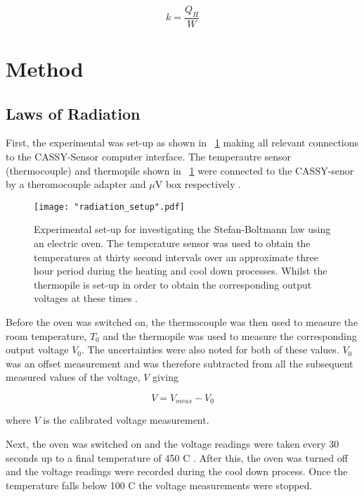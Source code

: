 \documentclass{article}
\newcommand{\figref}[2][\figurename~]{#1\ref{#2}}
\begin{document}
\begin{equation}
\label{eq:Heating}
k = \frac{Q_H}{W}
\end{equation}

 
\section{Method}
\label{sec:method}

\subsection{Laws of Radiation}
\label{ssec:radiaton-method}

First, the experimental was set-up as shown in \figref{fig:radiation} \cite{Paper01} making all relevant connections to the CASSY-Sensor computer interface. The temperautre sensor (thermocouple) and thermopile shown in \figref{fig:radiation} were connected to the CASSY-senor by a theromocouple adapter and $\mu$V box respectively \cite{Paper01}.

\begin{figure}[h]
\centering
\texttt{[image: "radiation\_setup".pdf]}
\caption{Experimental set-up for investigating the Stefan-Boltmann law using an electric oven. The temperature sensor was used to obtain the temperatures at thirty second intervals over an approximate three hour period during the heating and cool down processes. Whilst the thermopile is set-up in order to obtain the corresponding output voltages at these times \cite{Paper01}.}
\label{fig:radiation}
\end{figure}

\vspace{2mm}
\noindent
Before the oven was switched on, the thermocouple was then used to measure the room temperature, $T_0$ and the thermopile was used to measure the corresponding output voltage $V_0$. The uncertainties were also noted for both of these values. $V_0$ was an offset measurement and was therefore subtracted from all the subsequent measured values of the voltage, $V$ \cite{Paper01} giving

\begin{equation}
\label{eq:voltage-cal}
V = V_{meas} - V_0
\end{equation}

\vspace{2mm}
\noindent
where $V$ is the calibrated voltage measurement. 

\vspace{2mm}
\noindent
Next, the oven was switched on and the voltage readings were taken every 30 seconds up to a final temperature of 450 C \cite{Paper01}. After this, the oven was turned off and the voltage readings were recorded during the cool down process. Once the temperature falls below 100 C \cite{Paper01} the voltage measurements were stopped.
\end{document}
